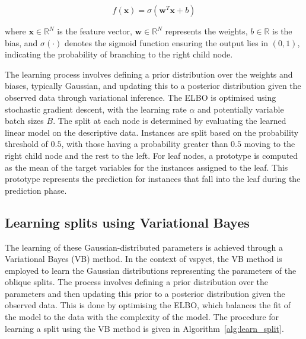 \documentclass[3p,review,authoryear]{elsarticle}
\begin{document}
\begin{equation}
f(\mathbf{x})=\sigma \left(\mathbf{w}^T \mathbf{x} + b \right)
\label{eq:linear_model}
\end{equation}

where $\mathbf{x} \in \mathbb{R}^N$ is the feature vector, $\mathbf{w} \in \mathbb{R}^N$ represents the weights, $b \in \mathbb{R}$ is the bias, and $\sigma(\cdot)$ denotes the sigmoid function ensuring the output lies in $(0, 1)$, indicating the probability of branching to the right child node.


The learning process involves defining a prior distribution over the weights and biases, typically Gaussian, and updating this to a posterior distribution given the observed data through variational inference.
The ELBO is optimised using stochastic gradient descent, with the learning rate $\alpha$ and potentially variable batch sizes $B$.
The split at each node is determined by evaluating the learned linear model on the descriptive data.
Instances are split based on the probability threshold of $0.5$, with those having a probability greater than $0.5$ moving to the right child node and the rest to the left.
For leaf nodes, a prototype is computed as the mean of the target variables for the instances assigned to the leaf.
This prototype represents the prediction for instances that fall into the leaf during the prediction phase.


\subsection{Learning splits using Variational Bayes}


The learning of these Gaussian-distributed parameters is achieved through a Variational Bayes (VB) method.
In the context of \gls{vspyct}, the VB method is employed to learn the Gaussian distributions representing the parameters of the oblique splits.
The process involves defining a prior distribution over the parameters and then updating this prior to a posterior distribution given the observed data.
This is done by optimising the ELBO, which balances the fit of the model to the data with the complexity of the model.
The procedure for learning a split using the VB method is given in Algorithm~\ref{alg:learn_split}.
\end{document}
